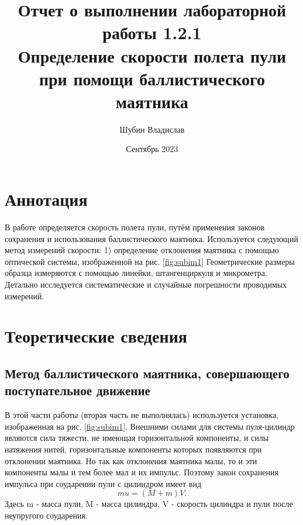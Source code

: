 \documentclass[a4paper, 12pt]{article}
\title{Отчет о выполнении лабораторной работы 1.2.1\\Определение скорости полета пули при помощи баллистического маятника}
\author{Шубин Владислав}
\date{Сентябрь 2023}
\begin{document}
    
	
	\maketitle
	
	\section{Аннотация}
	В работе определяется скорость полета пули, путём применения законов сохранения и использования баллистического маятника. Используется следующий метод измерений скорости: 1) определение отклонения маятника с помощью оптической системы, изображенной на рис. \ref{fig:subim1} Геометрические размеры образца измеряются с помощью линейки, штангенциркуля и микрометра. Детально исследуется систематические и случайные погрешности проводимых измерений.
	
	
	\section{Теоретические сведения}
	
	\subsection{Метод баллистического маятника, совершающего поступательное движение}
	
	В этой части работы (вторая часть не выполнялась) используется установка, изображенная на рис. \ref{fig:subim1}. Внешними силами для системы пуля-цилиндр являются сила тяжести, не имеющая горизонтальной компоненты, и силы натяжения нитей, горизонтальные компоненты которых появляются при отклонении маятника. Но так как отклонения маятника малы, то и эти компоненты малы и тем более мал и их импульс. Поэтому закон сохранения импульса при соударении пули с цилиндром имеет вид
	\begin{equation}
		mu = (M + m)V.
	\end{equation}
	Здесь m - масса пули, M - масса цилиндра, V - скорость цилиндра и пули после неупругого соударения.
	
\end{document}
